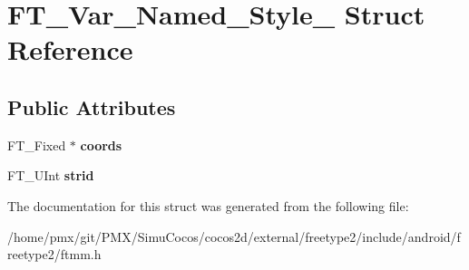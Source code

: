 \hypertarget{structFT__Var__Named__Style__}{}\section{F\+T\+\_\+\+Var\+\_\+\+Named\+\_\+\+Style\+\_\+ Struct Reference}
\label{structFT__Var__Named__Style__}
\subsection*{Public Attributes}
\begin{DoxyCompactItemize}
\item 
\mbox{\label{structFT__Var__Named__Style___a370161a79e82c543ee61284d2696b4d7}} 
F\+T\+\_\+\+Fixed $\ast$ {\bfseries coords}
\item 
\mbox{\label{structFT__Var__Named__Style___a7802f6958c6e883bdce16b9931002826}} 
F\+T\+\_\+\+U\+Int {\bfseries strid}
\end{DoxyCompactItemize}


The documentation for this struct was generated from the following file\+:\begin{DoxyCompactItemize}
\item 
/home/pmx/git/\+P\+M\+X/\+Simu\+Cocos/cocos2d/external/freetype2/include/android/freetype2/ftmm.\+h\end{DoxyCompactItemize}
